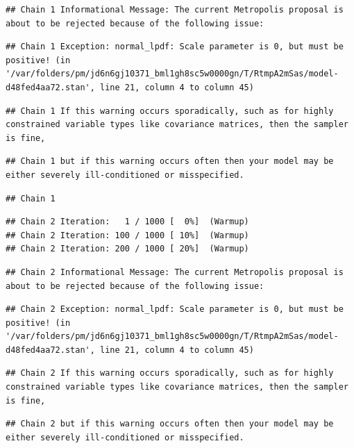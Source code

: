 \documentclass[
]{book}
\begin{document}
\begin{verbatim}
## Chain 1 Informational Message: The current Metropolis proposal is about to be rejected because of the following issue:
\end{verbatim}

\begin{verbatim}
## Chain 1 Exception: normal_lpdf: Scale parameter is 0, but must be positive! (in '/var/folders/pm/jd6n6gj10371_bml1gh8sc5w0000gn/T/RtmpA2mSas/model-d48fed4aa72.stan', line 21, column 4 to column 45)
\end{verbatim}

\begin{verbatim}
## Chain 1 If this warning occurs sporadically, such as for highly constrained variable types like covariance matrices, then the sampler is fine,
\end{verbatim}

\begin{verbatim}
## Chain 1 but if this warning occurs often then your model may be either severely ill-conditioned or misspecified.
\end{verbatim}

\begin{verbatim}
## Chain 1
\end{verbatim}

\begin{verbatim}
## Chain 2 Iteration:   1 / 1000 [  0%]  (Warmup) 
## Chain 2 Iteration: 100 / 1000 [ 10%]  (Warmup) 
## Chain 2 Iteration: 200 / 1000 [ 20%]  (Warmup)
\end{verbatim}

\begin{verbatim}
## Chain 2 Informational Message: The current Metropolis proposal is about to be rejected because of the following issue:
\end{verbatim}

\begin{verbatim}
## Chain 2 Exception: normal_lpdf: Scale parameter is 0, but must be positive! (in '/var/folders/pm/jd6n6gj10371_bml1gh8sc5w0000gn/T/RtmpA2mSas/model-d48fed4aa72.stan', line 21, column 4 to column 45)
\end{verbatim}

\begin{verbatim}
## Chain 2 If this warning occurs sporadically, such as for highly constrained variable types like covariance matrices, then the sampler is fine,
\end{verbatim}

\begin{verbatim}
## Chain 2 but if this warning occurs often then your model may be either severely ill-conditioned or misspecified.
\end{verbatim}
\end{document}
